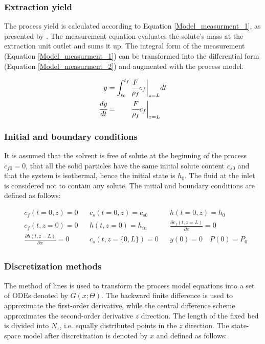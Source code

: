 \documentclass[a4paper,fleqn]{cas-dc}
\begin{document}
	\subsubsection{Extraction yield} \label{CH: Yield}
	
	The process yield is calculated according to Equation \ref{Model_measurment_1}, as presented by \citet{Sovova1994a}. The measurement equation evaluates the solute's mass at the extraction unit outlet and sums it up. The integral form of the measurement (Equation \ref{Model_measurment_1}) can be transformed into the differential form (Equation \ref{Model_measurment_2}) and augmented with the process model.
	
	{\footnotesize
		\begin{align} 
			\label{Model_measurment_1}
			y &= \int_{t_0}^{t_f} \cfrac{F}{\rho_f} c_f \biggr\rvert_{z=L} dt \\
			\cfrac{dy}{dt} &= \qquad \cfrac{F}{\rho_f} c_f \biggr\rvert_{z=L} 
			\label{Model_measurment_2}
	\end{align}	}
	
	\subsubsection{Initial and boundary conditions} 
	It is assumed that the solvent is free of solute at the beginning of the process $c_{f0}=0$, that all the solid particles have the same initial solute content $c_{s0}$ and that the system is isothermal, hence the initial state is $h_0$. The fluid at the inlet is considered not to contain any solute. The initial and boundary conditions are defined as follows:
	
	{\footnotesize
		\begin{align*}
			&c_f(t = 0, z) = 0  && c_s(t = 0, z) = c_{s0} && h(t = 0, z) = h_0 \\
			&c_f(t,   z=0) = 0  && h(t, z=0) = h_{in}  && \frac{\partial c_f(t,z=L)}{\partial x} = 0 \\
			&\frac{\partial h(t,z=L)}{\partial x} = 0   && c_s(t, z=\{0,L\}) = 0 && y(0) = 0 \quad P(0) = P_0 \\
	\end{align*} }
	
	\subsubsection{Discretization methods}
	
	The method of lines is used to transform the process model equations into a set of ODEs denoted by $G(x;\Theta)$. The backward finite difference is used to approximate the first-order derivative, while the central difference scheme approximates the second-order derivative $z$ direction. The length of the fixed bed is divided into $N_z$, i.e. equally distributed points in the $z$ direction. The state-space model after discretization is denoted by $x$ and defined as follows:
	
\end{document}

